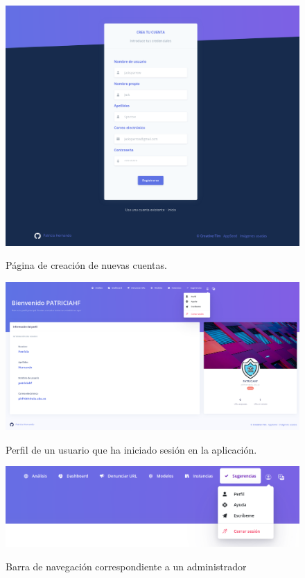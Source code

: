 \begin{figure}[h]
	\caption[Manual de usuario: crear nueva cuenta]{Página de creación de nuevas cuentas.}
	\centering
	\includegraphics[width=\textwidth]{../img/anexos/user_guide/8_register}
	\label{e-8:register}
\end{figure}

\begin{figure}[h]
	\caption[Manual de usuario: perfil]{Perfil de un usuario que ha iniciado sesión en la aplicación.}
	\centering
	\includegraphics[width=\textwidth]{../img/anexos/user_guide/8_profile}
	\label{e-8:profile}
\end{figure}

\begin{figure}[h]
	\caption[Manual de usuario: barra navegación (usuario iniciado)]{Barra de navegación correspondiente a un administrador}
	\centering
	\includegraphics[width=\textwidth]{../img/anexos/user_guide/9_navbar_init}
	\label{e-9:navbar}
\end{figure}

